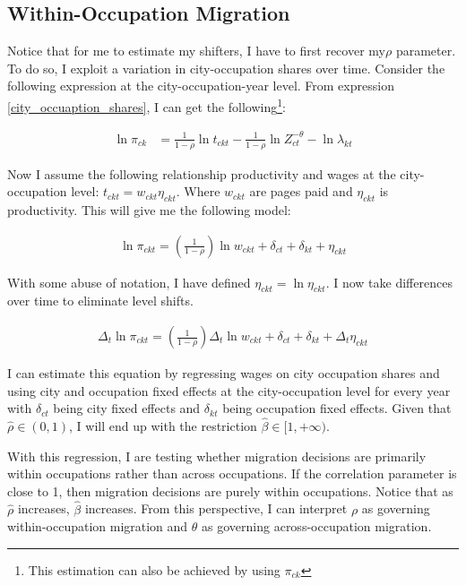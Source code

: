 \documentclass[10pt]{article}
\begin{document}
\subsection{Within-Occupation Migration}

Notice that for me to estimate my shifters, I have to first recover my$\rho$ parameter. To do so, I exploit a variation in city-occupation shares over time. Consider the following expression at the city-occupation-year level. From expression \ref{city_occuaption_shares}, I can get the following\footnote{This estimation can also be achieved by using $\pi_{ck}$}:

\begin{align*}
    \ln \pi_{ck} & = \frac{1}{1 - \rho} \ln t_{ckt} - \frac{1}{1 - \rho} \ln Z_{ct}^{- \theta} - \ln \lambda_{kt}
\end{align*}

Now I assume the following relationship productivity and wages at the city-occupation level: $t_{ckt} = w_{ckt} \eta_{ckt}$. Where $w_{ckt}$ are pages paid and $\eta_{ckt}$ is productivity. This will give me the following model:

\begin{align*}
    \ln \pi_{ckt} = \left( \frac{1}{1 - \rho} \right) \ln w_{ckt} + \delta_{ct} + \delta_{kt} + \eta_{ckt}
\end{align*}

With some abuse of notation, I have defined $\eta_{ckt} = \ln \eta_{ckt}$. I now take differences over time to eliminate level shifts.

\begin{align*}
    \Delta_t \ln \pi_{ckt} = \left( \frac{1}{1 - \rho} \right) \Delta_t \ln w_{ckt} + \delta_{ct} + \delta_{kt} + \Delta_t \eta_{ckt}
\end{align*}

I can estimate this equation by regressing wages on city occupation shares and using city and occupation fixed effects at the city-occupation level for every year with $\delta_{ct}$ being city fixed effects and $\delta_{kt}$ being occupation fixed effects. Given that $\hat{\rho} \in (0, 1)$, I will end up with the restriction $\hat{\beta} \in [1, +\infty)$.

With this regression, I are testing whether migration decisions are primarily within occupations rather than across occupations. If the correlation parameter is close to 1, then migration decisions are purely within occupations. Notice that as $\hat{\rho}$ increases, $\hat{\beta}$ increases. From this perspective, I can interpret $\rho$ as governing within-occupation migration and $\theta$ as governing across-occupation migration.
\end{document}
